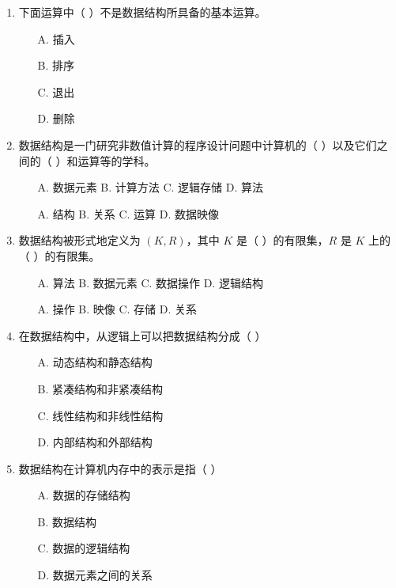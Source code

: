 \documentclass[12pt, a4paper]{article}
\begin{document}
\begin{enumerate}[label=\arabic*.]
	\item 下面运算中（ ）不是数据结构所具备的基本运算。
	      \begin{enumerate}
		      \item[A.] 插入
		      \item[B.] 排序
		      \item[C.] 退出
		      \item[D.] 删除
	      \end{enumerate}

	\item 数据结构是一门研究非数值计算的程序设计问题中计算机的（ ）以及它们之间的（ ）和运算等的学科。
	      \begin{enumerate}
		      \item[A.] 数据元素 \quad B. 计算方法 \quad C. 逻辑存储 \quad D. 算法
		      \item[A.] 结构 \quad B. 关系 \quad C. 运算 \quad D. 数据映像
	      \end{enumerate}

	\item 数据结构被形式地定义为 $(K, R)$，其中 $K$ 是（ ）的有限集，$R$ 是 $K$ 上的（ ）的有限集。
	      \begin{enumerate}
		      \item[A.] 算法 \quad B. 数据元素 \quad C. 数据操作 \quad D. 逻辑结构
		      \item[A.] 操作 \quad B. 映像 \quad C. 存储 \quad D. 关系
	      \end{enumerate}

	\item 在数据结构中，从逻辑上可以把数据结构分成（ ）
	      \begin{enumerate}
		      \item[A.] 动态结构和静态结构
		      \item[B.] 紧凑结构和非紧凑结构
		      \item[C.] 线性结构和非线性结构
		      \item[D.] 内部结构和外部结构
	      \end{enumerate}

	\item 数据结构在计算机内存中的表示是指（ ）
	      \begin{enumerate}
		      \item[A.] 数据的存储结构
		      \item[B.] 数据结构
		      \item[C.] 数据的逻辑结构
		      \item[D.] 数据元素之间的关系
	      \end{enumerate}


\end{enumerate}
\end{document}
